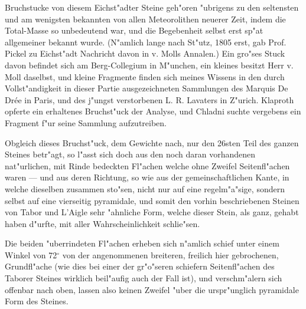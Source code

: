 \documentclass[a4paper, 11pt, oneside, german]{article}
\begin{document}
{\hspace*{6mm}Bruchstucke von diesem Eichst"adter Steine geh"oren "ubrigens zu den seltensten und am wenigsten bekannten von allen Meteorolithen neuerer Zeit, indem die Total-Masse so unbedeutend war, und die Begebenheit selbst erst sp"at allgemeiner bekannt wurde. (N"amlich lange nach St"utz, 1805 erst, gab Prof. Pickel zu Eichst"adt Nachricht davon in v. Molls Annalen.) Ein gro"ses Stuck davon befindet sich am Berg-Collegium in M"unchen, ein kleines besitzt Herr v. Moll daselbst, und kleine Fragmente finden sich meines Wissens in den durch Vollst"andigkeit in dieser Partie ausgezeichneten Sammlungen des Marquis De Drée in Paris, und des j"ungst verstorbenen L. R. Lavaters in Z"urich. Klaproth opferte ein erhaltenes Bruchst"uck der Analyse, und Chladni suchte vergebens ein Fragment f"ur seine Sammlung aufzutreiben.}

Obgleich dieses Bruchst"uck, dem Gewichte nach, nur den 26sten Teil des ganzen Steines betr"agt, so l"asst sich doch aus den noch daran vorhandenen nat"urlichen, mit Rinde bedeckten Fl"achen welche ohne Zweifel Seitenfl"achen waren --- und aus deren Richtung, so wie aus der gemeinschaftlichen Kante, in welche dieselben zusammen sto"sen, nicht nur auf eine regelm"a"sige, sondern selbst auf eine vierseitig pyramidale, und somit den vorhin beschriebenen Steinen von Tabor und L'Aigle sehr "ahnliche Form, welche dieser Stein, als ganz, gehabt haben d"urfte, mit aller Wahrscheinlichkeit schlie"sen.

Die beiden "uberrindeten Fl"achen erheben sich n"amlich schief unter einem Winkel von 72$^{\circ}$ von der angenommenen breiteren, freilich hier gebrochenen, Grundfl"ache (wie dies bei einer der gr"o"seren schiefern Seitenfl"achen des Taborer Steines wirklich beil"aufig auch der Fall ist), und verschm"alern sich offenbar nach oben, lassen also keinen Zweifel "uber die urspr"unglich pyramidale Form des Steines.
\end{document}
